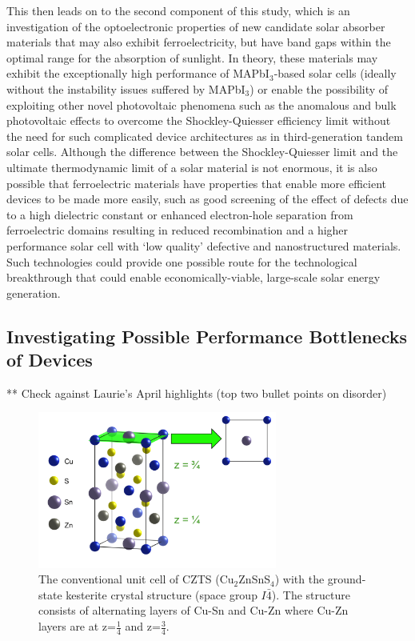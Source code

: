 This then leads on to the second component of this study, which is an investigation of the optoelectronic properties of new candidate solar absorber materials that may also exhibit ferroelectricity, but have band gaps within the optimal range for the absorption of sunlight. In theory, these materials may exhibit the exceptionally high performance of MAPbI$_3$-based solar cells (ideally without the instability issues suffered by MAPbI$_3$) or enable the possibility of exploiting other novel photovoltaic phenomena such as the anomalous and bulk photovoltaic effects to overcome the Shockley-Quiesser efficiency limit without the need for such complicated device architectures as in third-generation tandem solar cells. Although the difference between the Shockley-Quiesser limit and the ultimate thermodynamic limit of a solar material is not enormous, it is also possible that ferroelectric materials have properties that enable more efficient devices to be made more easily, such as good screening of the effect of defects due to a high dielectric constant or enhanced electron-hole separation from ferroelectric domains resulting in reduced recombination and a higher performance solar cell with `low quality' defective and nanostructured materials. Such technologies could provide one possible route for the technological breakthrough that could enable economically-viable, large-scale solar energy generation.

\subsection{Investigating Possible Performance Bottlenecks of {\CZTS } Devices}
** Check against Laurie's April highlights (top two bullet points on disorder)\\

\begin{figure}[h!]
  \centering
    \includegraphics[width=0.7\textwidth]{figures/CZTS_cell.png}
    \caption{The conventional unit cell of CZTS (Cu$_{2}$ZnSnS$_{4}$) with the ground-state kesterite crystal structure (space group $I\bar{4}$). The structure consists of alternating layers of Cu-Sn and Cu-Zn where Cu-Zn layers are at z=$\frac{1}{4}$ and z=$\frac{3}{4}$.}
  \label{CZTS_cell}
\end{figure}

